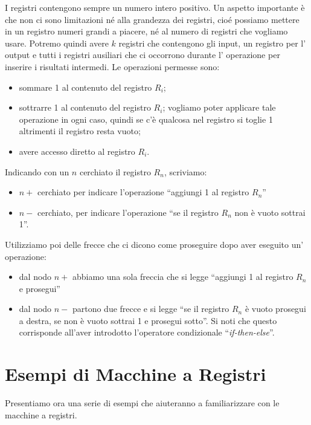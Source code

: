 I registri contengono sempre un numero intero positivo. Un aspetto
importante \`e che non ci sono limitazioni n\'e alla grandezza dei
registri, cio\'e possiamo mettere in un registro numeri grandi a
piacere, n\'e al numero di registri che vogliamo usare. Potremo quindi
avere \( k \) registri che contengono gli input, un registro per l'
output e tutti i registri ausiliari che ci occorrono durante l'
operazione per inserire i risultati intermedi. Le operazioni permesse
sono:
\begin{itemize}
\item sommare 1 al contenuto del registro \( R_i \);
\item sottrarre 1 al contenuto del registro \( R_i \); vogliamo poter
  applicare tale operazione in ogni caso, quindi se c'\`e qualcosa nel
  registro si toglie 1 altrimenti il registro resta vuoto;
\item avere accesso diretto al registro \( R_i \).
\end{itemize}

Indicando con un \( n \) cerchiato il registro \( R_n \), scriviamo:
\begin{itemize}
\item \( n+ \) cerchiato per indicare l'operazione ``aggiungi 1 al registro \( R_n \)''
\item \( n- \) cerchiato, per indicare l'operazione ``se il registro \( R_n \) non \`e vuoto
sottrai 1''.
\end{itemize}

Utiliz\-zia\-mo poi delle frecce che ci dicono come proseguire dopo
aver eseguito un' operazione:
\begin{itemize}
\item dal nodo \( n+ \) abbiamo una sola freccia che si legge
  ``aggiungi 1 al registro \( R_n \) e prosegui''
\item dal nodo \( n- \) partono due frecce e si legge ``se il registro
  \( R_n \) \`e vuoto prosegui a destra, se non \`e vuoto sottrai 1 e
  prosegui sotto''. Si noti che questo corrisponde all'aver introdotto
  l'operatore condizionale ``\emph{if-then-else}''.
\end{itemize}

\section{Esempi di Macchine a Registri}
Presentiamo ora una serie di esempi che aiuteranno a familiarizzare
con le macchine a registri.

